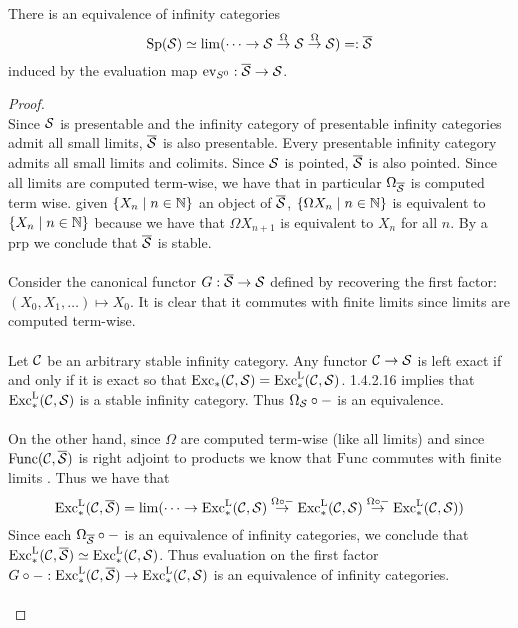 \documentclass[a4paper]{article}
\begin{document}
\begin{thm}{}{} There is an equivalence of infinity categories $$\text{Sp}(\mathcal{S})\simeq\lim(\cdots\rightarrow\mathcal{S}\overset{\Omega}{\rightarrow}\mathcal{S}\overset{\Omega}{\rightarrow}\mathcal{S})=:\overline{\mathcal{S}}$$ induced by the evaluation map $\text{ev}_{S^0}:\overline{\mathcal{S}}\to\mathcal{S}$. \tcbline
\begin{proof}~\\
Since $\mathcal{S}$ is presentable and the infinity category of presentable infinity categories admit all small limits, $\overline{\mathcal{S}}$ is also presentable. Every presentable infinity category admits all small limits and colimits. Since $\mathcal{S}$ is pointed, $\overline{\mathcal{S}}$ is also pointed. Since all limits are computed term-wise, we have that in particular $\Omega_{\overline{\mathcal{S}}}$ is computed term wise. given $\{X_n\;|\;n\in\mathbb{N}\}$ an object of $\overline{\mathcal{S}}$, $\{\Omega X_n\;|\;n\in\mathbb{N}\}$ is equivalent to $\{X_n\;|\;n\in\mathbb{N}\}$ because we have that $\Omega X_{n+1}$ is equivalent to $X_n$ for all $n$. By a prp we conclude that $\overline{\mathcal{S}}$ is stable. \\~\\

Consider the canonical functor $G:\overline{\mathcal{S}}\to\mathcal{S}$ defined by recovering the first factor: $(X_0,X_1,\dots)\mapsto X_0$. It is clear that it commutes with finite limits since limits are computed term-wise. \\~\\

Let $\mathcal{C}$ be an arbitrary stable infinity category. Any functor $\mathcal{C}\to\mathcal{S}$ is left exact if and only if it is exact so that $\text{Exc}_\ast(\mathcal{C},\mathcal{S})=\text{Exc}_\ast^\text{L}(\mathcal{C},\mathcal{S})$. 1.4.2.16 implies that $\text{Exc}_\ast^\text{L}(\mathcal{C},\mathcal{S})$ is a stable infinity category. Thus $\Omega_{\mathcal{S}}\circ -$ is an equivalence. \\~\\

On the other hand, since $\Omega$ are computed term-wise (like all limits) and since $\text{Func}(\mathcal{C},\overline{\mathcal{S}})$ is right adjoint to products we know that $\text{Func}$ commutes with finite limits . Thus we have that $$\text{Exc}_\ast^\text{L}(\mathcal{C},\overline{\mathcal{S}})=\lim(\cdots\rightarrow\text{Exc}_\ast^{\text{L}}(\mathcal{C},\mathcal{S})\overset{\Omega\circ-}{\rightarrow}\text{Exc}_\ast^{\text{L}}(\mathcal{C},\mathcal{S})\overset{\Omega\circ-}{\rightarrow}\text{Exc}_\ast^{\text{L}}(\mathcal{C},\mathcal{S}))$$ Since each $\Omega_{\overline{\mathcal{S}}}\circ -$ is an equivalence of infinity categories, we conclude that $\text{Exc}_\ast^{\text{L}}(\mathcal{C},\overline{\mathcal{S}})\simeq\text{Exc}_\ast^{\text{L}}(\mathcal{C},\mathcal{S})$. Thus evaluation on the first factor $G\circ -:\text{Exc}_\ast^{\text{L}}(\mathcal{C},\overline{\mathcal{S}})\to\text{Exc}_\ast^{\text{L}}(\mathcal{C},\mathcal{S})$ is an equivalence of infinity categories. \\~\\


\end{proof}
\end{thm}
\end{document}
